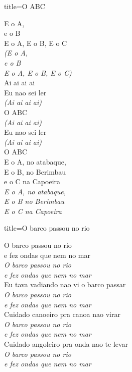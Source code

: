 \documentclass[fontsize=14pt, twoside]{scrreprt}
\begin{document}
\begin{multicols*}{2}
\begin{song}{title={O ABC}}
        \begin{verse*}
            E o A,\\
            e o B\\
            E o A, E o B, E o C\\
            \textit{(E o A,}\\
            \textit{e o B}\\
            \textit{E o A, E o B, E o C)}\\
            Ai ai ai ai\\
            Eu nao sei ler\\
            \textit{(Ai ai ai ai)}\\
            O ABC\\
            \textit{(Ai ai ai ai)}\\
            Eu nao sei ler\\
            \textit{(Ai ai ai ai)}\\
            O ABC\\
            E o A, no atabaque, \\ 
            E o B, no Berimbau\\ 
            e o C na Capoeira\\
            \textit{E o A, no atabaque,\\
            E o B no Berimbau \\ 
            E o C na Capoeira}\\
        \end{verse*}
\end{song}

\columnbreak

\begin{song}{title={O barco passou no rio}}
        \begin{verse*}
            O barco passou no rio \\
            e fez ondas que nem no mar\\
            \textit{O barco passou no rio \\
            e fez ondas que nem no mar}\\
            Eu tava vadiando nao vi o barco passar\\
            \textit{O barco passou no rio\\
            e fez ondas que nem no mar}\\
            Cuidado canoeiro pra canoa nao virar\\
            \textit{O barco passou no rio \\
            e fez ondas que nem no mar}\\
            Cuidado angoleiro pra onda nao te levar\\
            \textit{O barco passou no rio\\
            e fez ondas que nem no mar}\\
        \end{verse*}
\end{song}



\end{multicols*}
\end{document}
